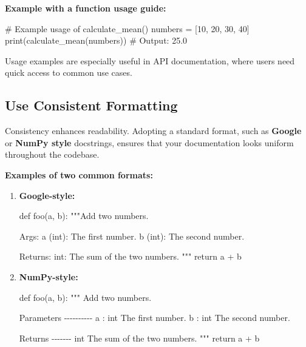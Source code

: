\documentclass[
  letterpaper,
  DIV=11,
  numbers=noendperiod]{scrreprt}
\newenvironment{Shaded}{\begin{snugshade}}{\end{snugshade}}
\newcommand{\BuiltInTok}[1]{\textcolor[rgb]{0.00,0.23,0.31}{#1}}
\newcommand{\CommentTok}[1]{\textcolor[rgb]{0.37,0.37,0.37}{#1}}
\newcommand{\ControlFlowTok}[1]{\textcolor[rgb]{0.00,0.23,0.31}{#1}}
\newcommand{\DecValTok}[1]{\textcolor[rgb]{0.68,0.00,0.00}{#1}}
\newcommand{\KeywordTok}[1]{\textcolor[rgb]{0.00,0.23,0.31}{#1}}
\newcommand{\NormalTok}[1]{\textcolor[rgb]{0.00,0.23,0.31}{#1}}
\newcommand{\OperatorTok}[1]{\textcolor[rgb]{0.37,0.37,0.37}{#1}}
\begin{document}
\textbf{Example with a function usage guide:}

\begin{Shaded}
\begin{Highlighting}[]
\CommentTok{\# Example usage of calculate\_mean()}
\NormalTok{numbers }\OperatorTok{=}\NormalTok{ [}\DecValTok{10}\NormalTok{, }\DecValTok{20}\NormalTok{, }\DecValTok{30}\NormalTok{, }\DecValTok{40}\NormalTok{]}
\BuiltInTok{print}\NormalTok{(calculate\_mean(numbers))  }\CommentTok{\# Output: 25.0}
\end{Highlighting}
\end{Shaded}

Usage examples are especially useful in API documentation, where users
need quick access to common use cases.

\hypertarget{use-consistent-formatting}{%
\subsection{Use Consistent Formatting}\label{use-consistent-formatting}}

Consistency enhances readability. Adopting a standard format, such as
\textbf{Google} or \textbf{NumPy style} docstrings, ensures that your
documentation looks uniform throughout the codebase.

\textbf{Examples of two common formats:}

\begin{enumerate}
\def\labelenumi{\arabic{enumi}.}
\item
  \textbf{Google-style:}

\begin{Shaded}
\begin{Highlighting}[]
\KeywordTok{def}\NormalTok{ foo(a, b):}
    \CommentTok{"""Add two numbers.}

\CommentTok{    Args:}
\CommentTok{        a (int): The first number.}
\CommentTok{        b (int): The second number.}

\CommentTok{    Returns:}
\CommentTok{        int: The sum of the two numbers.}
\CommentTok{    """}
    \ControlFlowTok{return}\NormalTok{ a }\OperatorTok{+}\NormalTok{ b}
\end{Highlighting}
\end{Shaded}
\item
  \textbf{NumPy-style:}

\begin{Shaded}
\begin{Highlighting}[]
\KeywordTok{def}\NormalTok{ foo(a, b):}
    \CommentTok{"""}
\CommentTok{    Add two numbers.}

\CommentTok{    Parameters}
\CommentTok{    {-}{-}{-}{-}{-}{-}{-}{-}{-}{-}}
\CommentTok{    a : int}
\CommentTok{        The first number.}
\CommentTok{    b : int}
\CommentTok{        The second number.}

\CommentTok{    Returns}
\CommentTok{    {-}{-}{-}{-}{-}{-}{-}}
\CommentTok{    int}
\CommentTok{        The sum of the two numbers.}
\CommentTok{    """}
    \ControlFlowTok{return}\NormalTok{ a }\OperatorTok{+}\NormalTok{ b}
\end{Highlighting}
\end{Shaded}
\end{enumerate}
\end{document}
